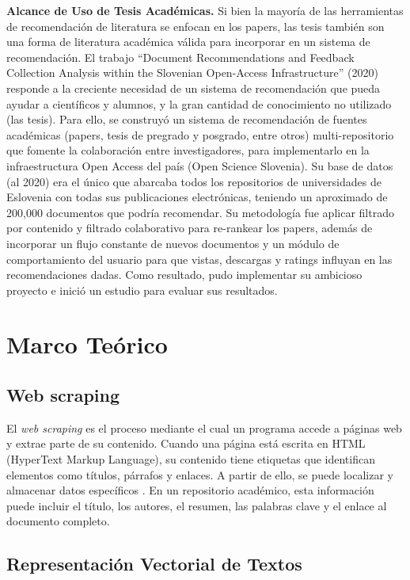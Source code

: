 \documentclass[conference]{IEEEtran}
\begin{document}
\textbf{Alcance de Uso de Tesis Académicas.} Si bien la mayoría de las herramientas de recomendación de literatura se enfocan en los papers, las tesis también son una forma de literatura académica válida para incorporar en un sistema de recomendación. El trabajo ``Document Recommendations and Feedback Collection Analysis within the Slovenian Open-Access Infrastructure'' (2020) \cite{Borovic2020} responde a la creciente necesidad de un sistema de recomendación que pueda ayudar a científicos y alumnos, y la gran cantidad de conocimiento no utilizado (las tesis). Para ello, se construyó un sistema de recomendación de fuentes académicas (papers, tesis de pregrado y posgrado, entre otros) multi-repositorio que fomente la colaboración entre investigadores, para implementarlo en la infraestructura Open Access del país (Open Science Slovenia). Su base de datos (al 2020) era el único que abarcaba todos los repositorios de universidades de Eslovenia con todas sus publicaciones electrónicas, teniendo un aproximado de 200,000 documentos que podría recomendar. Su metodología fue aplicar filtrado por contenido y filtrado colaborativo para re-rankear los papers, además de incorporar un flujo constante de nuevos documentos y un módulo de comportamiento del usuario para que vistas, descargas y ratings influyan en las recomendaciones dadas. Como resultado, pudo implementar su ambicioso proyecto e inició un estudio para evaluar sus resultados.

\section{Marco Teórico}

\subsection{Web scraping}

El \textit{web scraping} es el proceso mediante el cual un programa accede a páginas web y extrae parte de su contenido. Cuando una página está escrita en HTML (HyperText Markup Language), su contenido tiene etiquetas que identifican elementos como títulos, párrafos y enlaces. A partir de ello, se puede localizar y almacenar datos específicos \cite{crescenzi2001}. En un repositorio académico, esta información puede incluir el título, los autores, el resumen, las palabras clave y el enlace al documento completo.

\subsection{Representación Vectorial de Textos}
\end{document}
